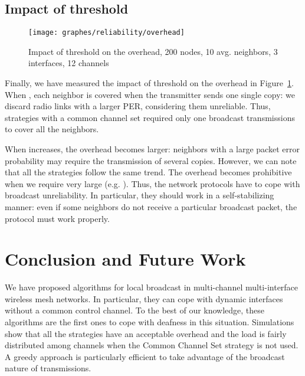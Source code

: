 \documentclass[twoside]{article}
\begin{document}
{\subsection{Impact of threshold }
\begin{figure}
\begin{center}
	\texttt{[image: graphes/reliability/overhead]}
	\caption{Impact of threshold   on the overhead, 200 nodes, 10 avg. neighbors, 3 interfaces, 12 channels}
	\label{fig:reliability_overhead}
\end{center}
\end{figure}


Finally, we have measured the impact of threshold  on the overhead in Figure~\ref{fig:reliability_overhead}.
When , each neighbor is covered when the transmitter sends one single copy: we discard radio links with a larger PER, considering them unreliable. 
Thus, strategies with a common channel set required only one broadcast transmissions to cover all the neighbors.

When  increases, the overhead becomes larger: neighbors with a
large packet error probability may require the transmission of several copies.
However, we can note that all the strategies follow the same trend.  
The overhead becomes prohibitive when we require very large  (e.g. ).
Thus, the network protocols have to cope with broadcast unreliability.
In particular, they should work in a self-stabilizing manner: even if some neighbors do not receive a particular broadcast packet, the protocol must work properly. 







\section{Conclusion and Future Work}
\label{section:conclusion}


We have proposed algorithms for local broadcast in multi-channel
multi-interface wireless mesh networks.
In particular, they can cope with dynamic interfaces without a common control channel. 
To the best of our knowledge, these algorithms are the first ones to cope with deafness in this situation. 
Simulations show that all the strategies have an acceptable overhead and the load is fairly distributed among channels when the Common Channel Set strategy is not used.
A greedy approach is particularly efficient to take advantage of the broadcast
nature of transmissions.  

}
\end{document}
